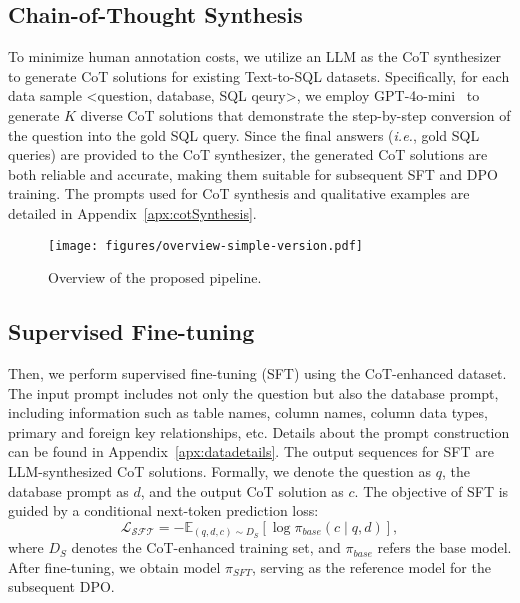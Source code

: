 \subsection{Chain-of-Thought Synthesis}
To minimize human annotation costs, we utilize an LLM as the CoT synthesizer to generate CoT solutions for existing Text-to-SQL datasets. Specifically, for each data sample <question, database, SQL qeury>, we employ GPT-4o-mini~\citep{openai2024@gpt4-mini} to generate $K$ diverse CoT solutions that demonstrate the step-by-step conversion of the question into the gold SQL query. Since the final answers (\emph{i.e.}, gold SQL queries) are provided to the CoT synthesizer, the generated CoT solutions are both reliable and accurate, making them suitable for subsequent SFT and DPO training. The prompts used for CoT synthesis and qualitative examples are detailed in Appendix~\ref{apx:cotSynthesis}.

\begin{figure}[t!]
  \centering
  \texttt{[image: figures/overview-simple-version.pdf]}
  \caption{Overview of the proposed pipeline.}
  \label{fig:overview}
\end{figure}

\subsection{Supervised Fine-tuning}
Then, we perform supervised fine-tuning (SFT) using the CoT-enhanced dataset. The input prompt includes not only the question but also the database prompt, including information such as table names, column names, column data types, primary and foreign key relationships, etc. Details about the prompt construction can be found in Appendix~\ref{apx:datadetails}. The output sequences for SFT are LLM-synthesized CoT solutions. Formally, we denote the question as $q$, the database prompt as $d$, and the output CoT solution as $c$. The objective of SFT is guided by a conditional next-token prediction loss:
\begin{equation*}
\mathcal{L_{SFT}} = - \mathbb{E}_{(q,d,c) \sim D_{S}} [\log \pi_{base}(c \mid q, d)],
\end{equation*}
where $D_{S}$ denotes the CoT-enhanced training set, and $\pi_{base}$ refers the base model. After fine-tuning, we obtain model $\pi_{SFT}$, serving as the reference model for the subsequent DPO.

